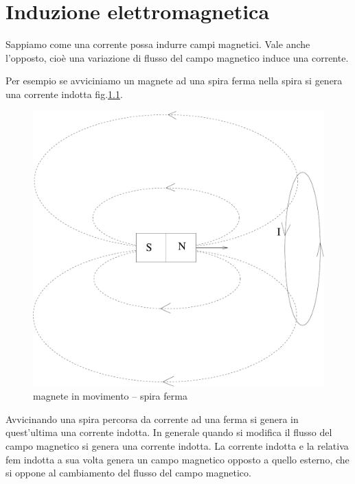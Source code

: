 \chapter{Induzione elettromagnetica}
\minitoc
Sappiamo come una corrente possa indurre campi magnetici. Vale anche l'opposto, cioè una variazione di flusso del campo magnetico induce una corrente.

Per esempio se avviciniamo un magnete ad una spira ferma nella spira si genera una corrente indotta fig.\@\ref{magnete_spira}.
\begin{figure}[htbp]
\centering
\includegraphics[scale=0.25]{immagini/fisica2/ind_spira01}
\caption{magnete in movimento -- spira ferma}
\label{magnete_spira}
\end{figure}
Avvicinando una spira percorsa da corrente ad una ferma si genera in quest'ultima una corrente indotta. In generale quando si modifica il flusso del campo magnetico si genera una corrente indotta. La corrente indotta e la relativa fem indotta a sua volta genera un campo magnetico opposto a quello esterno, che si oppone al cambiamento del flusso del campo magnetico.
